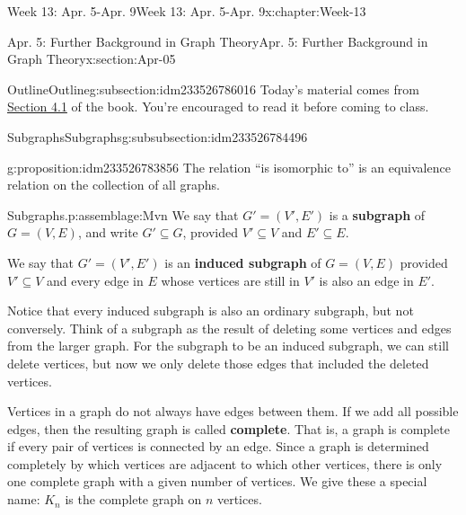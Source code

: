 \documentclass[oneside,10pt,]{book}
\newcommand{\terminology}[1]{\textbf{#1}}
\numberwithin{equation}{section}
\begin{document}
\typeout{************************************************}
%
\begin{chapterptx}{Week 13: Apr. 5-Apr. 9}{}{Week 13: Apr. 5-Apr. 9}{}{}{x:chapter:Week-13}
%
%
\typeout{************************************************}
\typeout{************************************************}
%
\begin{sectionptx}{Apr. 5: Further Background in Graph Theory}{}{Apr. 5: Further Background in Graph Theory}{}{}{x:section:Apr-05}
%
%
\typeout{************************************************}
\typeout{************************************************}
%
\begin{subsectionptx}{Outline}{}{Outline}{}{}{g:subsection:idm233526786016}
Today's material comes from \href{http://discrete.openmathbooks.org/dmoi3/sec_gt-intro.html}{Section 4.1} of the book. You're encouraged to read it before coming to class.%
%
%
\typeout{************************************************}
\typeout{************************************************}
%
\begin{subsubsectionptx}{Subgraphs}{}{Subgraphs}{}{}{g:subsubsection:idm233526784496}
\begin{proposition}{}{}{g:proposition:idm233526783856}%
The relation ``is isomorphic to'' is an equivalence relation on the collection of all graphs.%
\end{proposition}
\begin{assemblage}{Subgraphs.}{p:assemblage:Mvn}%
We say that \(G' = (V', E')\) is a \terminology{subgraph} of \(G = (V, E)\), and write \(G' \subseteq G\), provided \(V' \subseteq V\) and \(E' \subseteq E\).%
\par
We say that \(G' = (V', E')\) is an \terminology{induced subgraph} of \(G = (V, E)\) provided \(V' \subseteq V\) and every edge in \(E\) whose vertices are still in \(V'\) is also an edge in \(E'\).%
\end{assemblage}
Notice that every induced subgraph is also an ordinary subgraph, but not conversely. Think of a subgraph as the result of deleting some vertices and edges from the larger graph. For the subgraph to be an induced subgraph, we can still delete vertices, but now we only delete those edges that included the deleted vertices.%
\par
{} Vertices in a graph do not always have edges between them. If we add all possible edges, then the resulting graph is called \terminology{complete}. That is, a graph is complete if every pair of vertices is connected by an edge. Since a graph is determined completely by which vertices are adjacent to which other vertices, there is only one complete graph with a given number of vertices. We give these a special name: \(K_n\) \label{g:notation:idm233526768496} is the complete graph on \(n\) vertices.%

\end{subsubsectionptx}
\end{subsectionptx}
\end{sectionptx}
\end{chapterptx}
\end{document}

